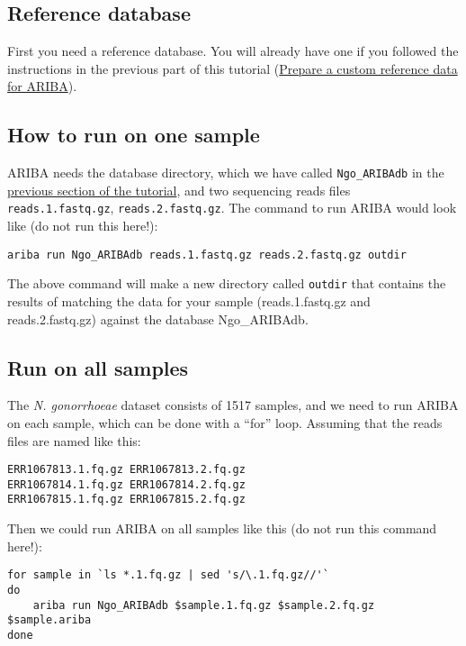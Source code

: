 \documentclass[11pt]{article}
\begin{document}
\hypertarget{reference-database}{%
\subsection{Reference database}\label{reference-database}}

First you need a reference database. You will already have one if you
followed the instructions in the previous part of this tutorial
(\href{make_custom_db.ipynb}{Prepare a custom reference data for
ARIBA}).

    \hypertarget{how-to-run-on-one-sample}{%
\subsection{How to run on one sample}\label{how-to-run-on-one-sample}}

ARIBA needs the database directory, which we have called
\texttt{Ngo\_ARIBAdb} in the \href{make_custom_db.ipynb}{previous
section of the tutorial}, and two sequencing reads files
\texttt{reads.1.fastq.gz}, \texttt{reads.2.fastq.gz}. The command to run
ARIBA would look like (do not run this here!):

\begin{verbatim}
ariba run Ngo_ARIBAdb reads.1.fastq.gz reads.2.fastq.gz outdir
\end{verbatim}

The above command will make a new directory called \texttt{outdir} that
contains the results of matching the data for your sample
(reads.1.fastq.gz and reads.2.fastq.gz) against the database
Ngo\_ARIBAdb.

    \hypertarget{run-on-all-samples}{%
\subsection{Run on all samples}\label{run-on-all-samples}}

The \textit{N. gonorrhoeae} dataset consists of 1517 samples, and we need
to run ARIBA on each sample, which can be done with a ``for'' loop.
Assuming that the reads files are named like this:

\begin{verbatim}
ERR1067813.1.fq.gz ERR1067813.2.fq.gz
ERR1067814.1.fq.gz ERR1067814.2.fq.gz
ERR1067815.1.fq.gz ERR1067815.2.fq.gz
\end{verbatim}

Then we could run ARIBA on all samples like this (do not run this
command here!):

\begin{verbatim}
for sample in `ls *.1.fq.gz | sed 's/\.1.fq.gz//'`
do
    ariba run Ngo_ARIBAdb $sample.1.fq.gz $sample.2.fq.gz $sample.ariba
done
\end{verbatim}
\end{document}
